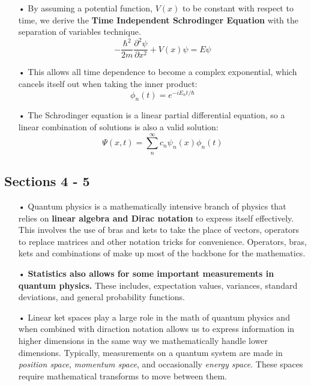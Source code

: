 \documentclass[12pt,letterpaper]{book}
\begin{document}
\begin{enumerate}
\item[•]By assuming a potential function, $V(x)$ to be constant with respect to time, we derive the \textbf{Time Independent Schrodinger Equation} with the separation of variables technique.
\begin{equation}
-\frac{\hbar^2}{2m}\frac{\partial^2 \psi}{\partial x^2} + V(x)\psi = E\psi
\end{equation}

\item[•]This allows all time dependence to become a complex exponential, which cancels itself out when taking the inner product:
\begin{equation}
\phi_n(t) = e^{-iE_nt/\hbar}
\end{equation}

\item[•]The Schrodinger equation is a linear partial differential equation, so a linear combination of solutions is also a valid solution:
\begin{equation}
\Psi(x,t) = \sum_n^{\infty} c_n \psi_n(x) \phi_n(t)
\end{equation}
\end{enumerate}


\subsection*{Sections 4 - 5}

\begin{enumerate}

\item[•]Quantum physics is a mathematically intensive branch of physics that relies on \textbf{linear algebra and Dirac notation} to express itself effectively. This involves the use of bras and kets to take the place of vectors, operators to replace matrices and other notation tricks for convenience. Operators, bras, kets and combinations of make up most of the backbone for the mathematics.

\item[•]\textbf{Statistics also allows for some important measurements in quantum physics.} These includes, expectation values, variances, standard deviations, and general probability functions.

\item[•]Linear ket spaces play a large role in the math of quantum physics and when combined with diraction notation allows us to express information in higher dimensions in the same way we mathematically handle lower dimensions. Typically, measurements on a quantum system are made in \textit{position space}, \textit{momentum space}, and occasionally \textit{energy space}. These spaces require mathematical transforms to move between them.

\end{enumerate}
\end{document}
